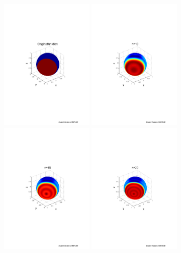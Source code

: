 \begin{refsection}
\begin{figure}%
\centering
\includegraphics[width=0.4\textwidth]{kugel/Gibbs/GibbsOriginalFunktion.pdf}
\includegraphics[width=0.4\textwidth]{kugel/Gibbs/GibbsN_10.pdf}
\includegraphics[width=0.4\textwidth]{kugel/Gibbs/GibbsN_15.pdf}
\includegraphics[width=0.4\textwidth]{kugel/Gibbs/GibbsN_20.pdf}

\end{figure}
\end{refsection}
